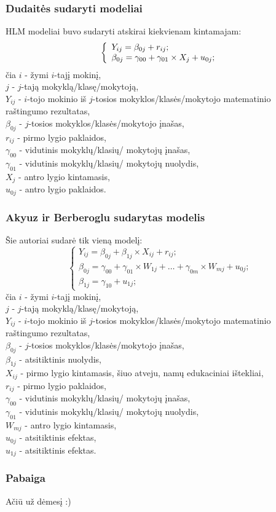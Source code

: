 \documentclass[utf8,hyperref={unicode,pdftex}]{beamer}
\begin{document}
\begin{frame}
\frametitle{Dudaitės sudaryti modeliai}
HLM modeliai buvo sudaryti atskirai kiekvienam kintamajam:
\[ \left\{
  \begin{array}{l l}
    Y_{ij} = \beta_{0j}+r_{ij}; \\
    \beta_{0j} = \gamma_{00} + \gamma_{01}\times X_{j}+u_{0j};
  \end{array} \right.\]
\small
čia $i$ - žymi $i$-tajį mokinį,\\
$j$ - $j$-tają mokyklą/klasę/mokytoją,\\
$Y_{ij}$ - $i$-tojo mokinio iš $j$-tosios mokyklos/klasės/mokytojo matematinio raštingumo rezultatas,\\
$\beta_{0j}$ - $j$-tosios mokyklos/klasės/mokytojo įnašas,\\
$r_{ij}$ - pirmo lygio paklaidos,\\
$\gamma_{00}$ - vidutinis mokyklų/klasių/ mokytojų įnašas,\\
$\gamma_{01}$ - vidutinis mokyklų/klasių/ mokytojų nuolydis,\\
$X_j$ - antro lygio kintamasis, \\
$u_{0j}$ - antro lygio paklaidos.
\end{frame}

\begin{frame}
\frametitle{Akyuz ir Berberoglu sudarytas modelis}
Šie autoriai sudarė tik vieną modelį:
\[ \left\{
  \begin{array}{l}
    Y_{ij} = \beta_{0j}+\beta_{1j}\times X_{ij}+r_{ij}; \\
    \beta_{0j} = \gamma_{00} + \gamma_{01}\times W_{1j}+\dots+\gamma_{0m}\times W_{mj}+u_{0j};\\
    \beta_{1j} = \gamma_{10} + u_{1j};
  \end{array} \right.\]
\small
čia $i$ - žymi $i$-tajį mokinį,\\
$j$ - $j$-tają mokyklą/klasę/mokytoją,\\
$Y_{ij}$ - $i$-tojo mokinio iš $j$-tosios mokyklos/klasės/mokytojo matematinio raštingumo rezultatas,\\
$\beta_{0j}$ - $j$-tosios mokyklos/klasės/mokytojo įnašas,\\
$\beta_{1j}$ - atsitiktinis nuolydis,\\
$X_{ij}$ - pirmo lygio kintamasis, šiuo atveju, namų edukaciniai ištekliai, \\
$r_{ij}$ - pirmo lygio paklaidos,\\
$\gamma_{00}$ - vidutinis mokyklų/klasių/ mokytojų įnašas,\\
$\gamma_{01}$ - vidutinis mokyklų/klasių/ mokytojų nuolydis,\\
$W_{mj}$ - antro lygio kintamasis, \\
$u_{0j}$ - atsitiktinis efektas,\\
$u_{1j}$ - atsitiktinis efektas.
\end{frame}

\begin{frame}
\frametitle{Pabaiga}
\LARGE
Ačiū už dėmesį :)
\end{frame}
\end{document}
